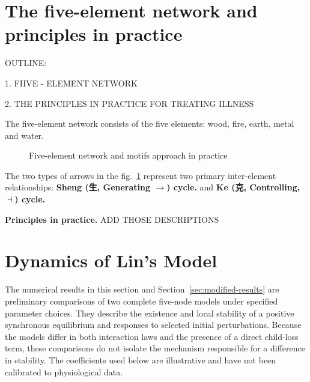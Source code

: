 \documentclass{article}
\begin{document}
\section{The five-element network and principles in practice}

OUTLINE:

1. FIIVE - ELEMENT NETWORK

2. THE PRINCIPLES IN PRACTICE FOR TREATING ILLNESS

The five-element network consists of the five elements: wood, fire, earth, metal and water. 
\begin{figure}[!htb]
\centering
{}

\caption{Five-element network  and motifs approach in practice}
\label{F:WuXing}
\end{figure}
The two types of arrows in the fig.~\ref{F:WuXing} represent two primary inter-element relationships: \textbf{Sheng (生, Generating $\to $) cycle.} and \textbf{Ke (克, Controlling, $\dashv$) cycle.}

{\bf Principles in practice.}
ADD THOSE DESCRIPTIONS

\section{Dynamics of Lin's Model}
\label{sec:lin-results}

The numerical results in this section and Section~\ref{sec:modified-results}
are preliminary comparisons of two complete five-node models under specified
parameter choices. They describe the existence and local stability of a
positive synchronous equilibrium and responses to selected initial
perturbations. Because the models differ in both interaction laws and the
presence of a direct child-loss term, these comparisons do not isolate the
mechanism responsible for a difference in stability. The coefficients used
below are illustrative and have not been calibrated to physiological data.
\end{document}
